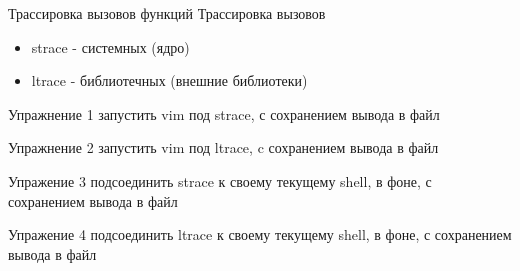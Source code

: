 \begin{frame}{Трассировка вызовов функций}
  Трассировка вызовов
  \begin{itemize}
    \item \alert{strace} - системных (ядро)
    \item \alert{ltrace} - библиотечных (внешние библиотеки)
  \end{itemize} \pause

  \alert{Упражнение 1} запустить vim под strace, с сохранением вывода в файл

  \alert{Упражнение 2} запустить vim под ltrace, c сохранением вывода в файл

  \alert{Упражение 3} подсоединить strace к своему текущему shell, в фоне, с сохранением вывода в файл
  
  \alert{Упражение 4} подсоединить ltrace к своему текущему shell, в фоне, с сохранением вывода в файл
\end{frame}


